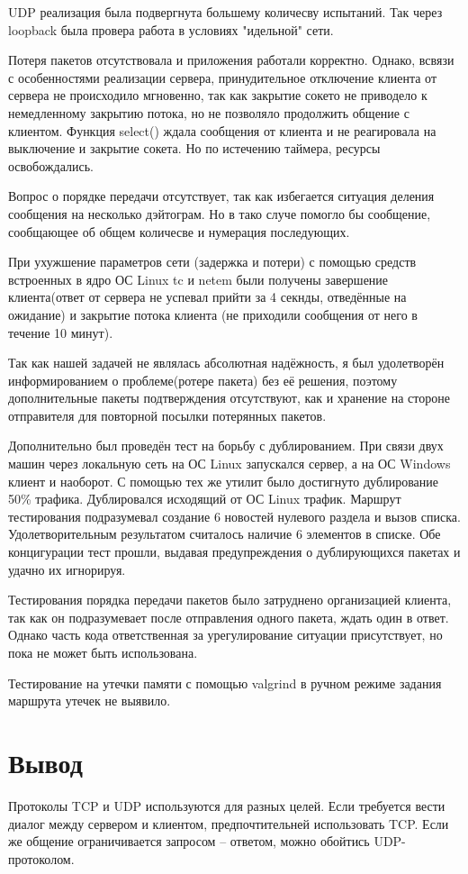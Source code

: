 \documentclass[a4paper]{article}
\begin{document}
UDP реализация была подвергнута большему количесву испытаний. Так через loopback была провера работа в условиях "идельной" сети. 

Потеря пакетов отсутствовала и приложения работали корректно. Однако, всвязи с особенностями реализации сервера, принудительное отключение клиента от сервера не происходило мгновенно, так как закрытие сокето не приводело к немедленному закрытию потока, но не позволяло продолжить общение с клиентом. Функция select() ждала сообщения от клиента и не реагировала на выключение и закрытие сокета. Но по истечению таймера, ресурсы освобождались.

Вопрос о порядке передачи отсутствует, так как избегается ситуация деления сообщения на несколько дэйтограм. Но в тако случе помогло бы сообщение, сообщающее об общем количесве и нумерация последующих.

При ухужшение параметров сети (задержка и потери) с помощью средств встроенных в ядро ОС Linux tc и netem были получены завершение клиента(ответ от сервера не успевал прийти за 4 секнды, отведённые на ожидание) и закрытие потока клиента (не приходили сообщения от него в течение 10 минут).

Так как нашей задачей не являлась абсолютная надёжность, я был удолетворён информированием о проблеме(ротере пакета) без её решения, поэтому дополнительные пакеты подтверждения отсутствуют, как и хранение на стороне отправителя для повторной посылки потерянных пакетов.

Дополнительно был проведён тест на борьбу с дублированием. При связи двух машин через локальную сеть на ОС Linux запускался сервер, а на ОС Windows клиент и наоборот. С помощью тех же утилит было достигнуто дублирование 50\% трафика. Дублировался исходящий от ОС Linux трафик. Маршрут тестирования подразумевал создание 6 новостей нулевого раздела и вызов списка. Удолетворительным результатом считалось наличие 6 элементов в списке. Обе концигурации тест прошли, выдавая предупреждения о дублирующихся пакетах и удачно их игнорируя.

Тестирования порядка передачи пакетов было затруднено организацией клиента, так как он подразумевает после отправления одного пакета, ждать один в ответ. Однако часть кода ответственная за урегулирование ситуации присутствует, но пока не может быть использована. 

Тестирование на утечки памяти с помощью valgrind в ручном режиме задания маршрута утечек не выявило.
\section{ Вывод}
Протоколы TCP и UDP используются для разных целей. Если требуется вести диалог между сервером и клиентом, предпочтительней использовать TCP. Если же общение ограничивается запросом – ответом, можно обойтись UDP-протоколом.
\end{document}

